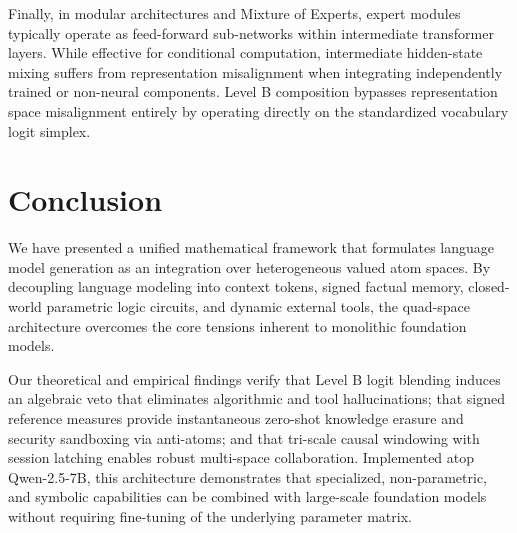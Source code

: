 \documentclass[preprint,12pt]{elsarticle}
\begin{document}
Finally, in modular architectures and Mixture of Experts, expert modules~\cite{gururangan2022demix} typically operate as feed-forward sub-networks within intermediate transformer layers. While effective for conditional computation, intermediate hidden-state mixing suffers from representation misalignment when integrating independently trained or non-neural components. Level B composition bypasses representation space misalignment entirely by operating directly on the standardized vocabulary logit simplex.

\section{Conclusion}

We have presented a unified mathematical framework that formulates language model generation as an integration over heterogeneous valued atom spaces. By decoupling language modeling into context tokens, signed factual memory, closed-world parametric logic circuits, and dynamic external tools, the quad-space architecture overcomes the core tensions inherent to monolithic foundation models. 

Our theoretical and empirical findings verify that Level B logit blending induces an algebraic veto that eliminates algorithmic and tool hallucinations; that signed reference measures provide instantaneous zero-shot knowledge erasure and security sandboxing via anti-atoms; and that tri-scale causal windowing with session latching enables robust multi-space collaboration. Implemented atop Qwen-2.5-7B, this architecture demonstrates that specialized, non-parametric, and symbolic capabilities can be combined with large-scale foundation models without requiring fine-tuning of the underlying parameter matrix.
\end{document}
